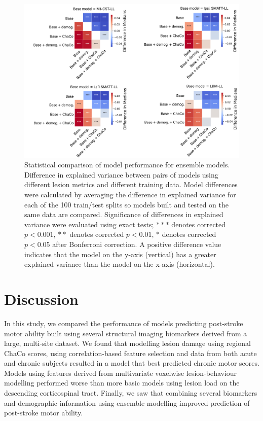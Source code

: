 \documentclass[10pt]{article}
\begin{document}
\begin{figure}[htp]
\centering
\includegraphics[width=1\linewidth]{figures/Analysis2_matrix_annot.png}
\caption{Statistical comparison of model performance for ensemble models. Difference in explained variance between pairs of models using different lesion metrics and different training data. Model differences were calculated by averaging the difference in explained variance for each of the 100 train/test splits so models built and tested on the same data are compared. Significance of differences in explained variance were evaluated using exact tests; $***$ denotes corrected $p < 0.001$, $**$ denotes corrected $p < 0.01$, $*$ denotes corrected $p < 0.05$ after Bonferroni correction. A positive difference value indicates that the model on the y-axis (vertical) has a greater explained variance than the model on the x-axis (horizontal).}
\label{analysis2_matrix}
\end{figure}

\section{Discussion}
In this study, we compared the performance of models predicting post-stroke motor ability built using several structural imaging biomarkers derived from a large, multi-site dataset. We found that modelling lesion damage using regional ChaCo scores, using correlation-based feature selection and data from both acute and chronic subjects resulted in a model that best predicted chronic motor scores. Models using features derived from multivariate voxelwise lesion-behaviour modelling performed worse than more basic models using lesion load on the descending corticospinal tract. Finally, we saw that combining several biomarkers and demographic information using ensemble modelling improved prediction of post-stroke motor ability.
\end{document}
